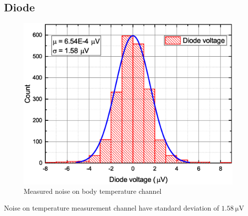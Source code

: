     \subsection{Diode}
        \begin{figure}[H]
            \centering
            \includegraphics[width=0.6\paperwidth]{img/07/diodeVoltage.eps}
            \caption{Measured noise on body temperature channel}
        \end{figure}

        Noise on temperature measurement channel have standard deviation of $\SI{1.58}{\uV}$
